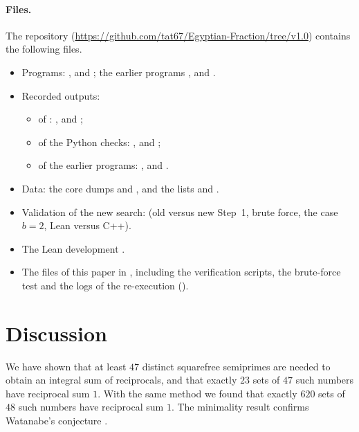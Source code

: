\documentclass[11pt]{article}
\newcommand{\repourl}{\url{https://github.com/tat67/Egyptian-Fraction/tree/v1.0}}
\begin{document}
\paragraph{Files.}
The repository (\repourl) contains the following files.
\begin{itemize}
\item Programs: ,  and ; the earlier programs ,  and .
\item Recorded outputs:
  \begin{itemize}
  \item of : ,  and ;
  \item of the Python checks: ,  and ;
  \item of the earlier programs: ,  and .
  \end{itemize}
\item Data: the core dumps  and , and the lists  and .
\item Validation of the new search:  (old versus new Step~1, brute force, the case $b=2$, Lean versus C++).
\item The Lean development .
\item The files of this paper in , including the verification scripts, the brute-force test and the logs of the re-execution ().
\end{itemize}

\section{Discussion}\label{sec:discussion}

We have shown that at least $47$ distinct squarefree semiprimes are needed to obtain an integral sum of reciprocals, and that exactly $23$ sets of $47$ such numbers have reciprocal sum $1$. With the same method we found that exactly $620$ sets of $48$ such numbers have reciprocal sum $1$.
The minimality result confirms Watanabe's conjecture \cite{Watanabe2020}.
\end{document}

